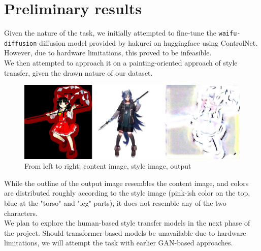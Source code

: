 \documentclass{article}
\begin{document}
\section{Preliminary results}
Given the nature of the task, we initially attempted to fine-tune the \texttt{waifu-diffusion} diffusion model provided by hakurei on huggingface \cite{waifu-diffusion} using ControlNet. However, due to hardware limitations, this proved to be infeasible.\\
We then attempted to approach it on a painting-oriented approach of style transfer, given the drawn nature of our dataset.
\begin{figure}[h!]
\centering
\includegraphics[scale=0.3]{final-output.jpg}
\caption{From left to right: content image, style image, output}
\label{fig2}
\end{figure}
While the outline of the output image resembles the content image, and colors are distributed roughly according to the style image (pink-ish color on the top, blue at the "torso" and "leg" parts), it does not resemble any of the two characters.\\
We plan to explore the human-based style transfer models in the next phase of the project. Should transformer-based models be unavailable due to hardware limitations, we will attempt the task with earlier GAN-based approaches.



\end{document}
